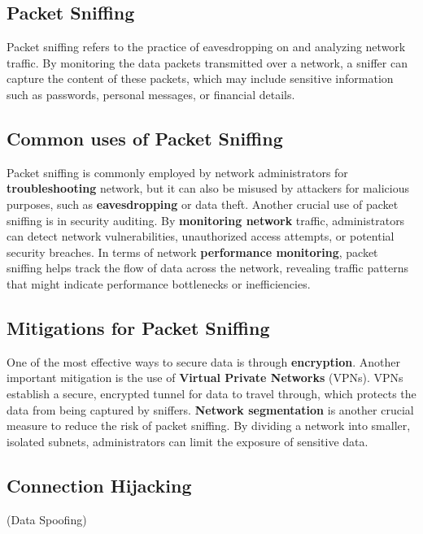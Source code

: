 \begin{center}
    \section{Packet Sniffing} 
\end{center}
Packet sniffing refers to the practice of eavesdropping on and analyzing network traffic. By monitoring the data packets transmitted over a network, a sniffer can capture the content of these packets, which may include sensitive information such as passwords, personal messages, or financial details.

\subsection{Common uses of Packet Sniffing}
Packet sniffing is commonly employed by network administrators for \textbf{troubleshooting} network, but it can also be misused by attackers for malicious purposes, such as \textbf{eavesdropping} or data theft. Another crucial use of packet sniffing is in security auditing. By \textbf{monitoring network} traffic, administrators can detect network vulnerabilities, unauthorized access attempts, or potential security breaches. In terms of network \textbf{performance monitoring}, packet sniffing helps track the flow of data across the network, revealing traffic patterns that might indicate performance bottlenecks or inefficiencies.

\subsection{Mitigations for Packet Sniffing}
One of the most effective ways to secure data is through \textbf{encryption}. Another important mitigation is the use of \textbf{Virtual Private Networks} (VPNs). VPNs establish a secure, encrypted tunnel for data to travel through, which protects the data from being captured by sniffers. \textbf{Network segmentation} is another crucial measure to reduce the risk of packet sniffing. By dividing a network into smaller, isolated subnets, administrators can limit the exposure of sensitive data. 


\begin{center}
    \section{Connection Hijacking} 

    (Data Spoofing)
\end{center}

